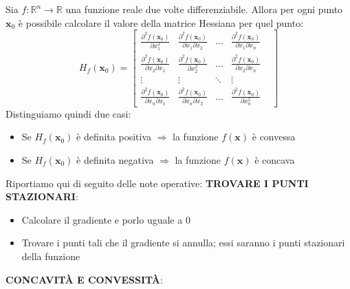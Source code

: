\documentclass[12pt]{article}
\begin{document}
Sia $f: \mathbb{R}^n \rightarrow \mathbb{R}$ una funzione reale due volte differenziabile. Allora per ogni punto $\boldsymbol{x}_0$ è possibile calcolare il valore della matrice Hessiana per quel punto:
$$H_f(\boldsymbol{x}_0) = \begin{bmatrix}
    \frac{\partial^2 f(\boldsymbol{x}_0)}{\partial x_1^2} & \frac{\partial^2 f(\boldsymbol{x}_0)}{\partial x_1 \partial x_2}  & \dots & \frac{\partial^2 f(\boldsymbol{x}_0)}{\partial x_1 \partial x_n} \\
    \frac{\partial^2 f(\boldsymbol{x}_0)}{\partial x_2 \partial x_1} & \frac{\partial^2 f(\boldsymbol{x}_0)}{\partial x_2^2} & \dots & \frac{\partial^2 f(\boldsymbol{x}_0)}{\partial x_2 \partial x_n} \\
    \vdots & \vdots & \ddots & \vdots & \\
    \frac{\partial^2 f(\boldsymbol{x}_0)}{\partial x_n \partial x_1} & \frac{\partial^2 f(\boldsymbol{x}_0)}{\partial x_n \partial x_2} & \dots & \frac{\partial^2 f(\boldsymbol{x}_0)}{\partial x_n^2}
\end{bmatrix}$$
Distinguiamo quindi due casi:
\begin{itemize}
    \item Se $H_f(\boldsymbol{x}_0)$ è definita positiva $\Rightarrow$ la funzione $f(\boldsymbol{x})$ è convessa
    \item Se $H_f(\boldsymbol{x}_0)$ è definita negativa $\Rightarrow$ la funzione $f(\boldsymbol{x})$ è concava
\end{itemize}
Riportiamo qui di seguito delle note operative: \newline
\textbf{TROVARE I PUNTI STAZIONARI}:
\begin{itemize}
    \item Calcolare il gradiente e porlo uguale a 0
    \item Trovare i punti tali che il gradiente si annulla; essi saranno i punti stazionari della funzione
\end{itemize}
\textbf{CONCAVITÀ E CONVESSITÀ}:
\end{document}
